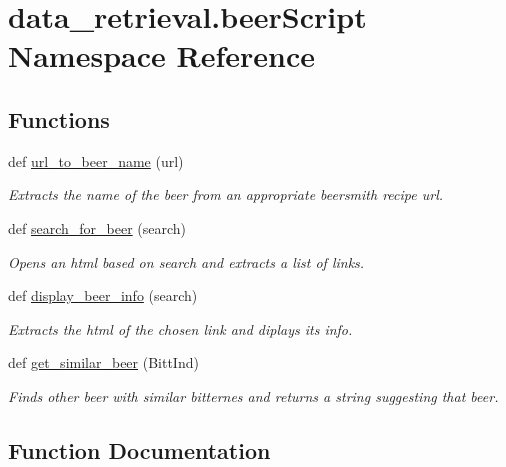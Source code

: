 \hypertarget{namespacedata__retrieval_1_1beer_script}{}\section{data\+\_\+retrieval.\+beer\+Script Namespace Reference}
\label{namespacedata__retrieval_1_1beer_script}
\subsection*{Functions}
\begin{DoxyCompactItemize}
\item 
def \hyperlink{namespacedata__retrieval_1_1beer_script_a77d437ec24f38f6c2e3fb38240b010d2}{url\+\_\+to\+\_\+beer\+\_\+name} (url)
\begin{DoxyCompactList}\small\item\em Extracts the name of the beer from an appropriate beersmith recipe url. \end{DoxyCompactList}\item 
def \hyperlink{namespacedata__retrieval_1_1beer_script_aad18f79bafd1041101129047c9adbccd}{search\+\_\+for\+\_\+beer} (search)
\begin{DoxyCompactList}\small\item\em Opens an html based on search and extracts a list of links. \end{DoxyCompactList}\item 
def \hyperlink{namespacedata__retrieval_1_1beer_script_a523f42beeb5498985fad7ba439db4015}{display\+\_\+beer\+\_\+info} (search)
\begin{DoxyCompactList}\small\item\em Extracts the html of the chosen link and diplays its info. \end{DoxyCompactList}\item 
def \hyperlink{namespacedata__retrieval_1_1beer_script_aa10a118b8c8a277f33594b1bbb88aa68}{get\+\_\+similar\+\_\+beer} (Bitt\+Ind)
\begin{DoxyCompactList}\small\item\em Finds other beer with similar bitternes and returns a string suggesting that beer. \end{DoxyCompactList}\end{DoxyCompactItemize}


\subsection{Function Documentation}
\hypertarget{namespacedata__retrieval_1_1beer_script_a523f42beeb5498985fad7ba439db4015}{}
